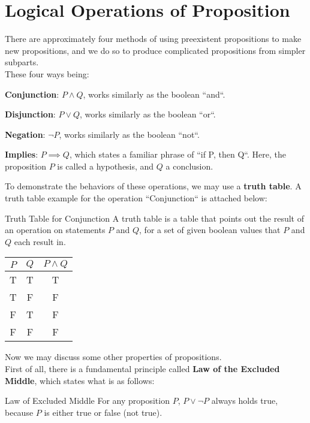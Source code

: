 \section{Logical Operations of Proposition}
There are approximately four methods of using preexistent propositions to make new propositions, and we do so to produce complicated propositions from simpler subparts. \\
These four ways being:
\begin{bindenum}
    \item \textbf{Conjunction}: $P \land Q$, works similarly as the boolean ``and``.
    \item \textbf{Disjunction}: $P \lor Q$, works similarly as the boolean ``or``.
    \item \textbf{Negation}: $\neg P$, works similarly as the boolean ``not``.
    \item \textbf{Implies}: $P \implies Q$, which states a familiar phrase of ``if P, then Q``. Here, the proposition $P$ is called a hypothesis, and $Q$ a conclusion.
\end{bindenum}
To demonstrate the behaviors of these operations, we may use a \textbf{truth table}. A truth table example for the operation ``Conjunction`` is attached below:
\begin{ln-fig}{Truth Table for Conjunction}{}
    A truth table is a table that points out the result of an operation on statements $P$ and $Q$, for a set of given boolean values that $P$ and $Q$ each result in.
    \begin{center}
        \begin{tabular}{c c||c}
            $P$ & $Q$ & $P \land Q$ \\
            \hline
            T & T & T \\
            \hline
            T & F & F \\
            \hline
            F & T & F \\
            \hline
            F & F & F
        \end{tabular}
    \end{center}
\end{ln-fig}
Now we may discuss some other properties of propositions. \\
First of all, there is a fundamental principle called \textbf{Law of the Excluded Middle}, which states what is as follows:
\begin{ln-axiom}{Law of Excluded Middle}{}
    For any proposition $P$, $P \lor \neg P$ always holds true, because $P$ is either true or false (not true).
\end{ln-axiom}
